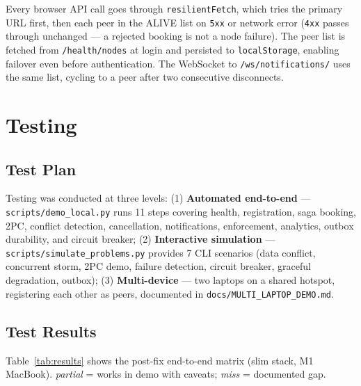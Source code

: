 \documentclass[11pt,a4paper]{article}
\begin{document}
Every browser API call goes through \texttt{resilientFetch}, which tries the primary URL first, then each peer in the ALIVE list on \texttt{5xx} or network error (\texttt{4xx} passes through unchanged — a rejected booking is not a node failure). The peer list is fetched from \texttt{/health/nodes} at login and persisted to \texttt{localStorage}, enabling failover even before authentication. The WebSocket to \texttt{/ws/notifications/} uses the same list, cycling to a peer after two consecutive disconnects.

\section{Testing}
\label{sec:testing}
 
\subsection{Test Plan}

Testing was conducted at three levels: (1) \textbf{Automated end-to-end} — \texttt{scripts/demo\_local.py} runs 11 steps covering health, registration, saga booking, 2PC, conflict detection, cancellation, notifications, enforcement, analytics, outbox durability, and circuit breaker; (2) \textbf{Interactive simulation} — \texttt{scripts/simulate\_problems.py} provides 7 CLI scenarios (data conflict, concurrent storm, 2PC demo, failure detection, circuit breaker, graceful degradation, outbox); (3) \textbf{Multi-device} — two laptops on a shared hotspot, registering each other as peers, documented in \texttt{docs/MULTI\_LAPTOP\_DEMO.md}.
 
\subsection{Test Results}

Table~\ref{tab:results} shows the post-fix end-to-end matrix (slim stack, M1 MacBook). \emph{partial} = works in demo with caveats; \emph{miss} = documented gap.
\end{document}
